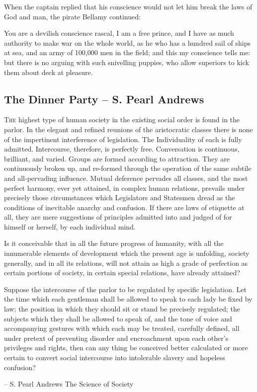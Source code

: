 \documentclass[a4paper,english,10pt,twoside]{article}
\begin{document}
\medskip
When the captain replied that his conscience would not let him break the laws of God and man, the pirate Bellamy continued:

\medskip
You are a devilish conscience rascal, I am a free prince, and I have as much authority to make war on the whole world, as he who has a hundred sail of ships at sea, and an army of 100,000 men in the field; and this my conscience tells me: but there is no arguing with such snivelling puppies, who allow superiors to kick them about deck at pleasure.

\subsection{The Dinner Party -- S. Pearl Andrews}

\lettrine{T}{he} highest type of human society in the existing social order is found in the parlor. In the elegant and refined reunions of the aristocratic classes there is none of the impertinent interference of legislation. The Individuality of each is fully admitted. Intercourse, therefore, is perfectly free. Conversation is continuous, brilliant, and varied. Groups are formed according to attraction. They are continuously broken up, and re-formed through the operation of the same subtile and all-pervading influence. Mutual deference pervades all classes, and the most perfect harmony, ever yet attained, in complex human relations, prevails under precisely those circumstances which Legislators and Statesmen dread as the conditions of inevitable anarchy and confusion. If there are laws of etiquette at all, they are mere suggestions of principles admitted into and judged of for himself or herself, by each individual mind.

\medskip
Is it conceivable that in all the future progress of humanity, with all the innumerable elements of development which the present age is unfolding, society generally, and in all its relations, will not attain as high a grade of perfection as certain portions of society, in certain special relations, have already attained?

\medskip
Suppose the intercourse of the parlor to be regulated by specific legislation. Let the time which each gentleman shall be allowed to speak to each lady be fixed by law; the position in which they should sit or stand be precisely regulated; the subjects which they shall be allowed to speak of, and the tone of voice and accompanying gestures with which each may be treated, carefully defined, all under pretext of preventing disorder and encroachment upon each other's privileges and rights, then can any thing be conceived better calculated or more certain to convert social intercourse into intolerable slavery and hopeless confusion?

\begin{flushright}-- S. Pearl Andrews The Science of Society\end{flushright}
\end{document}
